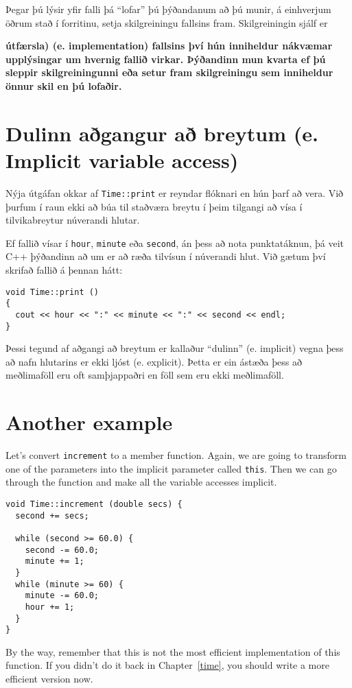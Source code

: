 Þegar þú lýsir yfir falli þá ``lofar'' þú þýðandanum að þú munir, á einhverjum öðrum stað í forritinu, setja skilgreiningu fallsins fram.
Skilgreiningin sjálf er {\bf útfærsla) (e. implementation) fallsins því hún inniheldur nákvæmar upplýsingar um hvernig fallið virkar.
Þýðandinn mun kvarta ef þú sleppir skilgreiningunni eða setur fram skilgreiningu sem inniheldur önnur skil en þú lofaðir.

\section {Dulinn aðgangur að breytum (e. Implicit variable access)}

Nýja útgáfan okkar af {\tt Time::print} er reyndar flóknari en hún þarf að vera.
Við þurfum í raun ekki að búa til staðværa breytu í þeim tilgangi að vísa í tilvikabreytur núverandi hlutar.

Ef fallið vísar í {\tt hour}, {\tt minute} eða {\tt second}, án þess að nota punktatáknun, þá veit C++ þýðandinn að um er að ræða tilvísun í núverandi hlut.
Við gætum því skrifað fallið á þennan hátt: 

\begin{verbatim}
void Time::print ()
{
  cout << hour << ":" << minute << ":" << second << endl;
}
\end{verbatim}
%
Þessi tegund af aðgangi að breytum er kallaður ``dulinn'' (e. implicit) vegna þess að nafn hlutarins er ekki ljóst (e. explicit). 
Þetta er ein ástæða þess að meðlimaföll eru oft samþjappaðri en föll sem eru ekki meðlimaföll.

\section {Another example}

Let's convert {\tt increment} to a member function.  Again, we
are going to transform one of the parameters into the implicit
parameter called {\tt this}.  Then we can go through the function
and make all the variable accesses implicit.

\begin{verbatim}
void Time::increment (double secs) {
  second += secs;

  while (second >= 60.0) {
    second -= 60.0;
    minute += 1;
  }
  while (minute >= 60) {
    minute -= 60.0;
    hour += 1;
  }
}
\end{verbatim}
%
By the way, remember that this is not the most efficient implementation
of this function.  If you didn't do it back in Chapter~\ref{time}, you
should write a more efficient version now.

}
